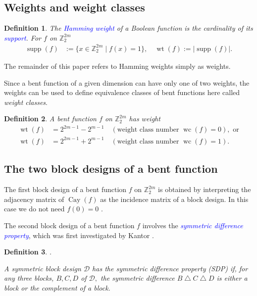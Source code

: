 \documentclass[12pt,a4paper]{article}
\newcommand{\mb}[1]{\mathbb{#1}}
\newcommand{\Z}{\mb{Z}}
\newcommand{\abs}[1]{\left| #1 \right|}
\newcommand{\Emph}[1]{\emph{\textcolor{blue}{#1}}}
\newcommand{\Cay}[1]{\operatorname{Cay}\left(#1\right)}
\newcommand{\support}[1]{\operatorname{supp}\left(#1\right)}
\newcommand{\weight}[1]{\operatorname{wt}\left(#1\right)}
\newcommand{\weightclass}[1]{\operatorname{wc}\left(#1\right)}
\newtheorem{Definition}{Definition}
\begin{document}
\subsection{Weights and weight classes}
\begin{Definition}
\label{def-weight}
The \Emph{Hamming weight} of a Boolean function is the cardinality of its \Emph{support}.
For $f$ on $\Z_2^{2m}$
\begin{align*}
\support{f} &:= \{x \in \Z_2^{2m} \mid f(x)=1 \}, \quad \weight{f} := \abs{ \support{f} }.
\end{align*}
\end{Definition}

The remainder of this paper refers to Hamming weights simply as weights.

Since a bent function of a given dimension can have only one of two weights,
the weights can be used to define equivalence classes of bent functions %
here called \emph{weight classes}.
\begin{Definition}
\label{def-weight-class}
A bent function $f$ on $\Z_2^{2m}$ has weight \cite[Theorem 6.2.10]{Dil74}
\begin{align*}
\weight{f} &= 2^{2 m - 1} - 2^{m-1} \quad (\text{weight class number~} \weightclass{f}=0),
\text{~or}
\\
\weight{f} &= 2^{2 m - 1} + 2^{m-1} \quad (\text{weight class number~} \weightclass{f}=1).
\end{align*}
\end{Definition}

%
%

\subsection{The two block designs of a bent function}

The first block design of a bent function $f$ on $\Z_2^{2m}$ is obtained by interpreting
the adjacency matrix of $\Cay{f}$ as the incidence matrix of a block design.
In this case we do not need $f(0)=0$ \cite[p. 160]{DilS87block}.

The second block design of a bent function $f$ involves the
\Emph{symmetric difference property}, which was first investigated by Kantor
\cite[Section 5]{Kan75symplectic}.
\begin{Definition}
\label{def-Symmetric-difference-property}
\cite[p. 49]{Kan75symplectic}.

A symmetric block design $\mathcal{D}$ has the symmetric difference property (SDP)
if, for any three blocks, $B, C, D$ of $\mathcal{D},$ the symmetric difference
$B \bigtriangleup C \bigtriangleup D$ is either a block or the complement of a block.
\end{Definition}
\end{document}
